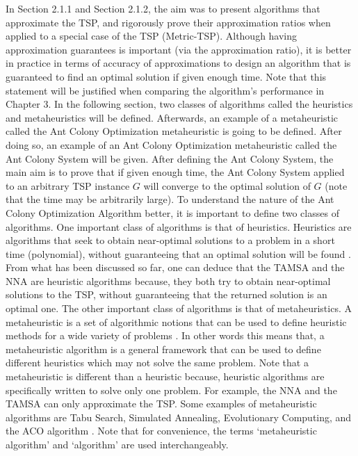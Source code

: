 \documentclass[12pt]{article}
\numberwithin{equation}{subsection}
\numberwithin{table}{subsection}
\numberwithin{algorithm}{subsection}
\begin{document}
In Section 2.1.1 and Section 2.1.2, the aim was to present algorithms that approximate the TSP, and rigorously prove their approximation ratios when applied to a special case of the TSP (Metric-TSP). Although having approximation guarantees is important (via the approximation ratio), it is better in practice in terms of accuracy of approximations to design an algorithm that is guaranteed to find an optimal solution if given enough time. Note that this statement will be justified when comparing the algorithm's performance in Chapter 3. In the following section, two classes of algorithms called the heuristics and metaheuristics will be defined. Afterwards, an example of a metaheuristic called the Ant Colony Optimization metaheuristic is going to be defined. After doing so, an example of an Ant Colony Optimization metaheuristic called the Ant Colony System will be given. After defining the Ant Colony System, the main aim is to prove that if given enough time, the Ant Colony System applied to an arbitrary TSP instance $G$ will converge to the optimal solution of $G$ (note that the time may be arbitrarily large).
{}
\label{section_ACO}
To understand the nature of the Ant Colony Optimization Algorithm better, it is important to define two classes of algorithms. One important class of algorithms is that of heuristics. Heuristics are algorithms that seek to obtain near-optimal solutions to a problem in a short time (polynomial), without guaranteeing that an optimal solution will be found \cite{dorigo_stutzle_thomas_2004}. From what has been discussed so far, one can deduce that the TAMSA and the NNA are heuristic algorithms because, they both try to obtain near-optimal solutions to the TSP, without guaranteeing that the returned solution is an optimal one. The other important class of algorithms is that of metaheuristics.  A metaheuristic is a set of algorithmic notions that can be used to define heuristic methods for a wide variety of problems \cite{dorigo_stutzle_thomas_2004}. In other words this means that, a metaheuristic algorithm is a general framework that can be used to define different heuristics which may not solve the same problem. Note that a metaheuristic is different than a heuristic because, heuristic algorithms are specifically written to solve only one problem. For example, the NNA and the TAMSA can only approximate the TSP. Some examples of metaheuristic algorithms are Tabu Search, Simulated Annealing, Evolutionary Computing, and the ACO algorithm \cite{dorigo_stutzle_thomas_2004}. Note that for convenience, the terms `metaheuristic algorithm' and `algorithm' are used interchangeably.\\\\
\end{document}
